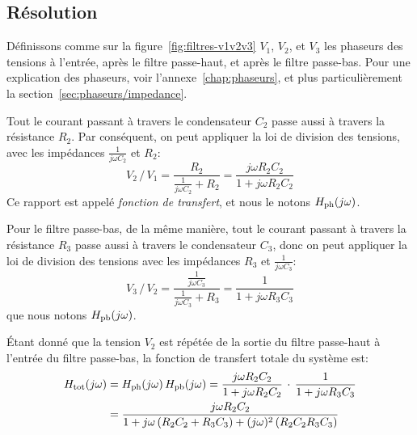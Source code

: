 \subsection{Résolution}
\label{complexes}

Définissons comme sur la figure~\ref{fig:filtres-v1v2v3}
$V_1$, $V_2$, et $V_3$ les phaseurs des tensions
à l'entrée, après le filtre passe-haut, et après le filtre passe-bas.
Pour une explication des phaseurs, voir l'annexe~\ref{chap:phaseurs},
et plus particulièrement la section~\ref{sec:phaseurs/impedance}.

Tout le courant passant à travers le condensateur $C_2$ passe
aussi à travers la résistance $R_2$.
Par conséquent, on peut appliquer la loi de division des tensions,
avec les impédances $\frac{1}{j\omega C_2}$ et $R_2$:
\begin{equation}
    V_2\,/\,V_1
    = \frac{R_2}{\frac{1}{j\omega C_2} + R_2}
    = \frac{j\omega R_2C_2}{1+j\omega R_2C_2}
\end{equation}
Ce rapport est appelé \emph{fonction de transfert}, et nous le notons
$H_{\mathrm{ph}}(j\omega)$.

Pour le filtre passe-bas, de la même manière, tout le courant
passant à travers la résistance $R_3$ passe aussi à travers le
condensateur $C_3$, donc on peut appliquer
la loi de division des tensions avec les impédances
$R_3$ et $\frac{1}{j\omega C_3}$:
\begin{equation}
    V_3\,/\,V_2
    = \frac{\frac{1}{j\omega C_3}}{\frac{1}{j\omega C_3} + R_3}
    = \frac{1}{1+j\omega R_3C_3}
\end{equation}
que nous notons $H_{\mathrm{pb}}(j\omega)$.

Étant donné que la tension $V_2$ est répétée de la sortie du filtre passe-haut
à l'entrée du filtre passe-bas, la fonction de transfert totale du système est:
\begin{align}
    H_{\mathrm{tot}}(j\omega) &= H_{\mathrm{ph}}(j\omega)\,H_{\mathrm{pb}}(j\omega) =
    \frac{j\omega R_2C_2}{1 + j\omega R_2C_2}\,\cdot\,
    \frac{1}{1 + j\omega R_3C_3}\\
    &= \frac{j\omega R_2C_2}{1 + j\omega\,(R_2C_2+R_3C_3) +
        (j\omega)^2\,(R_2C_2R_3C_3)}
\end{align}
